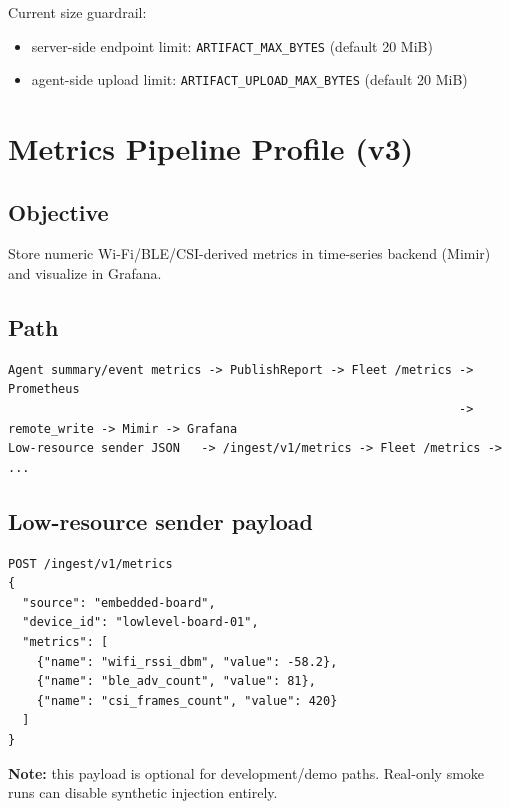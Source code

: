 \documentclass[11pt,a4paper]{article}
\begin{document}
Current size guardrail:
\begin{itemize}
  \item server-side endpoint limit: \texttt{ARTIFACT\_MAX\_BYTES} (default 20 MiB)
  \item agent-side upload limit: \texttt{ARTIFACT\_UPLOAD\_MAX\_BYTES} (default 20 MiB)
\end{itemize}

\section{Metrics Pipeline Profile (v3)}
\subsection{Objective}
Store numeric Wi-Fi/BLE/CSI-derived metrics in time-series backend (Mimir) and visualize in Grafana.

\subsection{Path}
\begin{verbatim}
Agent summary/event metrics -> PublishReport -> Fleet /metrics -> Prometheus
                                                               -> remote_write -> Mimir -> Grafana
Low-resource sender JSON   -> /ingest/v1/metrics -> Fleet /metrics -> ...
\end{verbatim}

\subsection{Low-resource sender payload}
\begin{verbatim}
POST /ingest/v1/metrics
{
  "source": "embedded-board",
  "device_id": "lowlevel-board-01",
  "metrics": [
    {"name": "wifi_rssi_dbm", "value": -58.2},
    {"name": "ble_adv_count", "value": 81},
    {"name": "csi_frames_count", "value": 420}
  ]
}
\end{verbatim}
\textbf{Note:} this payload is optional for development/demo paths. Real-only smoke runs can disable synthetic injection entirely.
\end{document}
